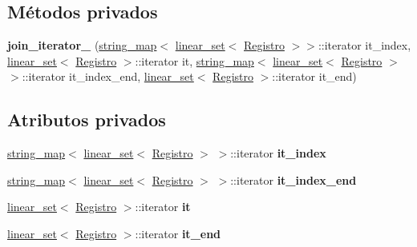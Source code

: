 \subsection*{Métodos privados}
\begin{DoxyCompactItemize}
\item 
\mbox{\label{classBaseDeDatos_1_1join__iterator__2_ab6dba08b4ebcac9d21601e5770b81aca}} 
{\bfseries join\+\_\+iterator\+\_} (\mbox{\hyperlink{classstring__map}{string\+\_\+map}}$<$ \mbox{\hyperlink{classlinear__set}{linear\+\_\+set}}$<$ \mbox{\hyperlink{classRegistro}{Registro}} $>$$>$\+::iterator it\+\_\+index, \mbox{\hyperlink{classlinear__set}{linear\+\_\+set}}$<$ \mbox{\hyperlink{classRegistro}{Registro}} $>$\+::iterator it, \mbox{\hyperlink{classstring__map}{string\+\_\+map}}$<$ \mbox{\hyperlink{classlinear__set}{linear\+\_\+set}}$<$ \mbox{\hyperlink{classRegistro}{Registro}} $>$$>$\+::iterator it\+\_\+index\+\_\+end, \mbox{\hyperlink{classlinear__set}{linear\+\_\+set}}$<$ \mbox{\hyperlink{classRegistro}{Registro}} $>$\+::iterator it\+\_\+end)
\end{DoxyCompactItemize}
\subsection*{Atributos privados}
\begin{DoxyCompactItemize}
\item 
\mbox{\label{classBaseDeDatos_1_1join__iterator__2_a16bb0e828d121d038eeec3f84be80bac}} 
\mbox{\hyperlink{classstring__map}{string\+\_\+map}}$<$ \mbox{\hyperlink{classlinear__set}{linear\+\_\+set}}$<$ \mbox{\hyperlink{classRegistro}{Registro}} $>$ $>$\+::iterator {\bfseries it\+\_\+index}
\item 
\mbox{\label{classBaseDeDatos_1_1join__iterator__2_a258f1841ee1e5cc1283cb5ac15926677}} 
\mbox{\hyperlink{classstring__map}{string\+\_\+map}}$<$ \mbox{\hyperlink{classlinear__set}{linear\+\_\+set}}$<$ \mbox{\hyperlink{classRegistro}{Registro}} $>$ $>$\+::iterator {\bfseries it\+\_\+index\+\_\+end}
\item 
\mbox{\label{classBaseDeDatos_1_1join__iterator__2_aaaa3847f7215f3364bb03a56f2092852}} 
\mbox{\hyperlink{classlinear__set}{linear\+\_\+set}}$<$ \mbox{\hyperlink{classRegistro}{Registro}} $>$\+::iterator {\bfseries it}
\item 
\mbox{\label{classBaseDeDatos_1_1join__iterator__2_a5b545c20eed8d431a7dea0dc78715f61}} 
\mbox{\hyperlink{classlinear__set}{linear\+\_\+set}}$<$ \mbox{\hyperlink{classRegistro}{Registro}} $>$\+::iterator {\bfseries it\+\_\+end}
\end{DoxyCompactItemize}
